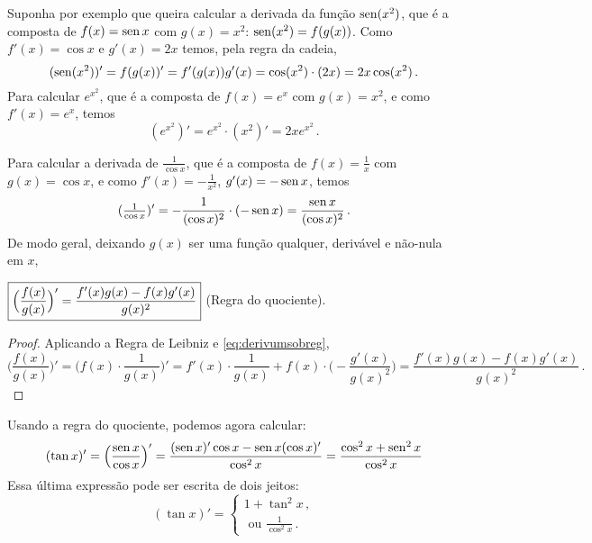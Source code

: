 \begin{ex}
Suponha por exemplo que queira calcular a derivada da função $\operatorname{sen}(x^2)$, que é
a composta de $f(x)=\operatorname{sen} x$ com $g(x)=x^2$: $\operatorname{sen}(x^2)=f(g(x))$. 
Como $f'(x)=\cos x$ e $g'(x)=2x$ temos, pela regra da
cadeia,
$$(\operatorname{sen}(x^2))'=f(g(x))'=f'(g(x))g'(x)=\cos(x^2)\cdot
(2x)=2x\cos (x^2)\,.$$
Para calcular $e^{x^2}$, que é
a composta de $f(x)=e^x$ com $g(x)=x^2$, e como $f'(x)=e^x$,
temos
$$(e^{x^2})'=e^{x^2}\cdot (x^2)'=2xe^{x^2}\,.$$
\end{ex}

\begin{ex}
Para calcular a derivada de $\frac{1}{\cos x}$, que é a composta de
$f(x)=\frac{1}{x}$ com $g(x)=\cos x$, e como $f'(x)=-\frac{1}{x^2}$,
$g'(x)=-\operatorname{sen} x$, temos
$$
(\tfrac{1}{\cos x})'=-\frac{1}{(\cos x)^2}\cdot (-\operatorname{sen} x)=\frac{\operatorname{sen} x}{(\cos
x)^2}\,.
$$
De modo geral, deixando $g(x)$ ser uma função qualquer, derivável e não-nula em
$x$,
\end{ex}

\begin{regra}\label{Regraquociente}
$\boxed{\Bigl(\frac{f(x)}{g(x)}\Bigr)'=\frac{f'(x)g(x)-f(x)g'(x)}{g(x)^2}}$ (Regra do
quociente).
\end{regra}
\begin{proof}
Aplicando a Regra de Leibniz e \eqref{eq:derivumsobreg},
$$
\Big(\frac{f(x)}{g(x)}\Big)'=
\Big(f(x)\cdot\frac{1}{g(x)}\Big)'=f'(x)\cdot\frac{1}{g(x)}+f(x)\cdot\Big(-\frac
{ g'(x) } { g(x)^2 }\Big)
=\frac{f'(x)g(x)-f(x)g'(x)}{g(x)^2}\,.
$$ 
\end{proof}
\begin{ex}
Usando a regra do quociente, podemos agora calcular:
$$(\tan x)'=\Big(
\frac{\operatorname{sen} x}{\cos x}\Big)'=\frac{(\operatorname{sen} x)'\cos x-\operatorname{sen} x(\cos x)'}{\cos^2x}
=\frac{\cos^2x+\operatorname{sen}^2x}{\cos^2x}
$$
Essa última expressão pode ser escrita de dois jeitos:
\[
\boxed{
(\tan x)'=
\begin{cases}
1+\tan^2x\,,\\
\text{ ou }\frac{1}{\cos^2x}\,.\
\end{cases}
}
\]
\end{ex}

